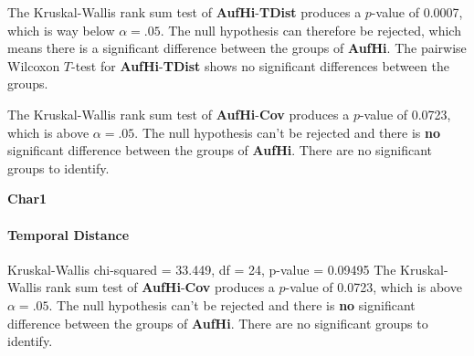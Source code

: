The Kruskal-Wallis rank sum test of \textbf{AufHi}-\textbf{TDist} produces a $p$-value of 0.0007, which is way below $\alpha=.05$. The null hypothesis can therefore be rejected, which means there is a significant difference between the groups of \textbf{AufHi}. The pairwise Wilcoxon $T$-test for \textbf{AufHi}-\textbf{TDist} shows no significant differences between the groups.

The Kruskal-Wallis rank sum test of \textbf{AufHi}-\textbf{Cov} produces a $p$-value of 0.0723, which is above $\alpha=.05$. The null hypothesis can't be rejected and there is \textbf{no} significant difference between the groups of \textbf{AufHi}. There are no significant groups to identify.

\Large
\centerline{\textbf{Char1}}
\normalsize

\paragraph{Temporal Distance}
Kruskal-Wallis chi-squared = 33.449, df = 24, p-value = 0.09495
The Kruskal-Wallis rank sum test of \textbf{AufHi}-\textbf{Cov} produces a $p$-value of 0.0723, which is above $\alpha=.05$. The null hypothesis can't be rejected and there is \textbf{no} significant difference between the groups of \textbf{AufHi}. There are no significant groups to identify.

